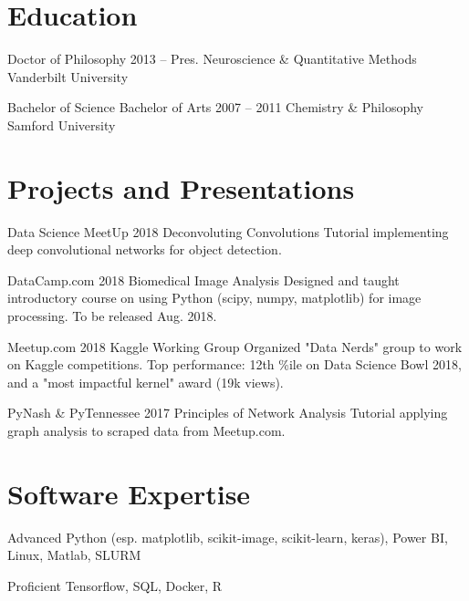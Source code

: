 \documentclass{tccv}
\begin{document}
\section{Education}

\begin{yearlist}

\item[Doctor of Philosophy]{2013 -- Pres.}
     {Neuroscience \& \newline Quantitative Methods}
     {Vanderbilt University}
\item[Bachelor of Science \newline Bachelor of Arts]{2007 -- 2011}
     {Chemistry \& Philosophy}
     {Samford University}
\end{yearlist}


\section{Projects and Presentations}

\begin{yearlist}

\item[Data Science MeetUp]{2018}
     {Deconvoluting Convolutions  \href{https://github.com/stkbailey/deconv-conv/blob/master/slides.pdf}{\textcolor{blue}\Mundus}}
     {Tutorial implementing deep convolutional networks for object detection.}

\item[DataCamp.com]{2018}
     {Biomedical Image Analysis}
     {Designed and taught introductory course on using Python (scipy, numpy, matplotlib) for image processing. To be released Aug. 2018.}

\item[Meetup.com]{2018}
     {Kaggle Working Group \href{https://www.meetup.com/Data-Nerds/}{\textcolor{blue}\Mundus}}
     {Organized "Data Nerds" group to work on Kaggle competitions. Top performance: 12th \%ile on Data Science Bowl 2018, and a "most impactful kernel" award (19k views).}

\item[PyNash \& PyTennessee]{2017}
     {Principles of Network Analysis \href{https://github.com/stkbailey/nashnetx/blob/master/slides/PopularPythonistas_v3_PyTN.pdf}{\textcolor{blue}\Mundus}}
     {Tutorial applying graph analysis to scraped data from Meetup.com.}

\end{yearlist}


\section{Software Expertise}

\begin{factlist}

     
\item{Advanced}
     {Python (esp. matplotlib, scikit-image, scikit-learn, keras), Power BI, Linux, Matlab, SLURM}

\item{Proficient}
     {Tensorflow, SQL, Docker, R}

\end{factlist}
\end{document}
